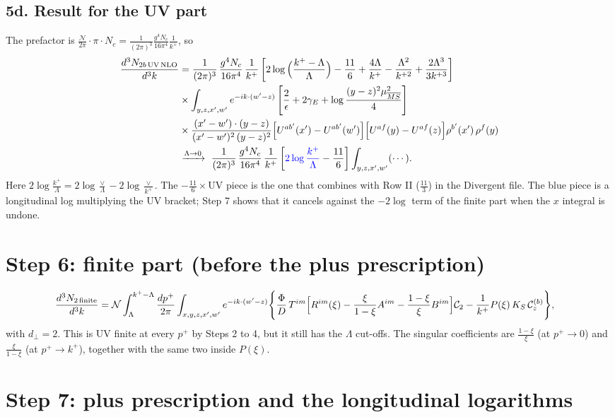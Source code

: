\documentclass[10pt]{article}
\numberwithin{equation}{section}
\newcommand{\Cz}{\mathcal{C}^{(b)}_{z}}
\newcommand{\UVb}{\left[\frac{2}{\epsilon}+2\gamma_{E}+\log\frac{(y-z)^{2}\mu^{2}_{\overline{MS}}}{4}\right]}
\newcommand{\Wl}{\Big[U^{ab'}(x')-U^{ab'}(w')\Big]}
\begin{document}
\subsection*{5d. Result for the UV part}
The prefactor is $\frac{\mathcal{N}}{2\pi}\cdot\pi\cdot N_{c}=\frac{1}{(2\pi)^{3}}\frac{g^{4}N_{c}}{16\pi^{4}}\frac{1}{k^{+}}$, so
\begin{align}
\frac{d^{3}N_{2b\,\rm UV\, NLO}}{d^{3}k} & = \frac{1}{(2\pi)^{3}}\,\frac{g^{4}N_{c}}{16\pi^{4}}\,\frac{1}{k^{+}}
\left[2\log\Big(\frac{k^{+}-\Lambda}{\Lambda}\Big)-\frac{11}{6}+\frac{4\Lambda}{k^{+}}-\frac{\Lambda^{2}}{k^{+2}}+\frac{2\Lambda^{3}}{3k^{+3}}\right]\notag\\
&\times\int_{y,z,x',w'}e^{-ik\cdot(w'-z)}\UVb\notag\\
&\times\frac{(x'-w')\cdot(y-z)}{(x'-w')^{2}\,(y-z)^{2}}\Wl\Big[U^{af}(y)-U^{af}(z)\Big]\rho^{b'}(x')\,\rho^{f}(y)\\
&\xrightarrow{\Lambda\to0}\ \frac{1}{(2\pi)^{3}}\,\frac{g^{4}N_{c}}{16\pi^{4}}\,\frac{1}{k^{+}}\left[{\color{blue}2\log\frac{k^{+}}{\Lambda}}-\frac{11}{6}\right]\int_{y,z,x',w'}(\cdots).
\end{align}
Here $2\log\frac{k^{+}}{\Lambda}=2\log\frac{\vee}{\Lambda}-2\log\frac{\vee}{k^{+}}$. The $-\frac{11}{6}\times$UV piece is the one that combines with Row II ($\frac{11}{3}$) in the Divergent file. The blue piece is a longitudinal log multiplying the UV bracket; Step 7 shows that it cancels against the $-2\log$ term of the finite part when the $x$ integral is undone.

\section{Step 6: finite part (before the plus prescription)}
\begin{align}
\frac{d^{3}N_{2\,\rm finite}}{d^{3}k}&=\mathcal{N}\int_{\Lambda}^{k^{+}-\Lambda}\frac{dp^{+}}{2\pi}\int_{x,y,z,x',w'}e^{-ik\cdot(w'-z)}\Bigg\{\frac{\Phi}{D}\,T^{im}\Big[R^{im}(\xi)-\frac{\xi}{1-\xi}A^{im}-\frac{1-\xi}{\xi}B^{im}\Big]\mathcal{C}_{2}-\frac{1}{k^{+}}P(\xi)\,K_{S}\,\Cz\Bigg\},
\label{eq:fin0}
\end{align}
with $d_{\perp}=2$. This is UV finite at every $p^{+}$ by Steps 2 to 4, but it still has the $\Lambda$ cut-offs. The singular coefficients are $\frac{1-\xi}{\xi}$ (at $p^{+}\to0$) and $\frac{\xi}{1-\xi}$ (at $p^{+}\to k^{+}$), together with the same two inside $P(\xi)$.

\section{Step 7: plus prescription and the longitudinal logarithms}
\end{document}
